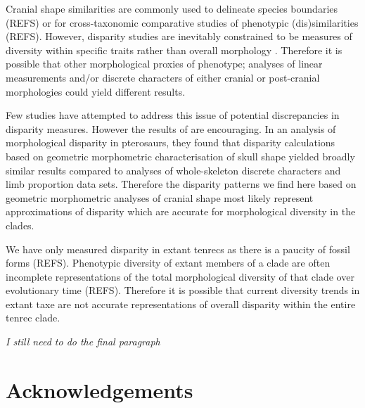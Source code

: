 \documentclass[12pt,a4paper]{article}
\begin{document}
Cranial shape similarities are commonly used to delineate species boundaries (REFS) or for cross-taxonomic comparative studies of phenotypic (dis)similarities (REFS). However, disparity studies are inevitably constrained to be measures of diversity within specific traits rather than overall morphology \citep{Roy1997}. Therefore it is possible that other morphological proxies of phenotype; analyses of linear measurements and/or discrete characters of either cranial or post-cranial morphologies could yield different results. 

Few studies have attempted to address this issue of potential discrepancies in disparity measures. However the results of \citep{Foth2012} are encouraging. In an analysis of morphological disparity in pterosaurs, they found that disparity calculations based on geometric morphometric characterisation of skull shape yielded broadly similar results compared to analyses of whole-skeleton discrete characters and limb proportion data sets. Therefore the disparity patterns we find here based on geometric morphometric analyses of cranial shape most likely represent approximations of disparity which are accurate for morphological diversity in the clades. 


We have only measured disparity in extant tenrecs as there is a paucity of fossil forms (REFS). Phenotypic diversity of extant members of a clade are often incomplete representations of the total morphological diversity of that clade over evolutionary time (REFS). Therefore it is possible that current diversity trends in extant taxe are not accurate representations of overall disparity within the entire tenrec clade. 



\textit{I still need to do the final paragraph}





\section*{Acknowledgements}





\end{document}
